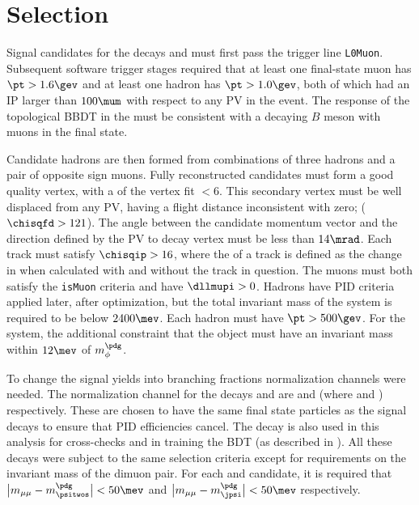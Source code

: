 \section{Selection}

Signal candidates for the decays \btokpipimumu and \btophikmumu must first pass the \lone trigger
line {\tt L0Muon}.
Subsequent software trigger stages required that at least one final-state muon has $\pt>1.6\gev$
and at least one hadron has $\pt>1.0\gev$, both of which had an IP larger than $100\mum$ with
respect to any PV in the event.
The response of the topological BBDT in the \hlttwo must be consistent with a decaying $B$ meson
with muons in the final state.


Candidate \Bp hadrons are then formed from combinations of three hadrons and a pair of opposite
sign muons.
Fully reconstructed candidates must form a good quality vertex, with a \chisq of the vertex fit
$<6$.
This secondary vertex must be well displaced from any PV, having a flight distance inconsistent
with zero; ($\chisqfd>121$).
The angle between the \Bp candidate momentum vector and the direction defined by the PV to \Bp decay
vertex must be less than $14\mrad$.
Each track must satisfy $\chisqip>16$, where the \chisqip of a track is defined as the change in
\chisqip when calculated with and without the track in question.
The muons must both satisfy the {\tt isMuon} criteria and have $\dllmupi>0$.
Hadrons have PID criteria applied later, after optimization, but the total invariant mass of the
\kpipi system is required to be below $2400\mev$.
Each hadron must have $\pt>500\gev$.
For the \phik system, the additional constraint that the \decay{\phi}{\kk} object must have an
invariant mass within $12\mev$ of $m_\phi^\pdg$.

To change the signal yields into branching fractions normalization channels were needed.
The normalization channel for the decays \btokpipimumu and \btophikmumu are \btopsitwosk and
\btojpsiphik (where \psitwostojpsipipi and \jpsitomumu) respectively.
These are chosen to have the same final state particles as the signal decays to ensure that PID
efficiencies cancel.
The decay \btojpsikpipi is also used in this analysis for cross-checks and in training the BDT (as
described in ).
All these decays were subject to the same selection criteria except for requirements on the
invariant mass of the dimuon pair.
For each \psitwos and \jpsi candidate, it is required that
$\big|m_{\mu\mu}-m_{\psitwos}^\pdg\big|<50\mev$ and
$\big|m_{\mu\mu}-m_\jpsi^\pdg\big|<50\mev$ respectively.



